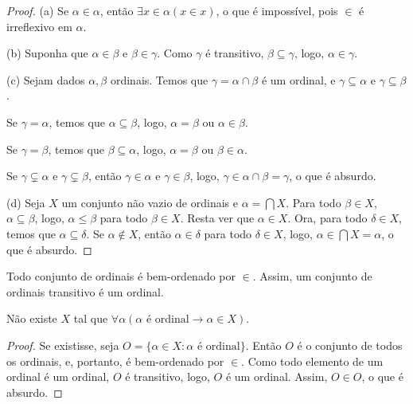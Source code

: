 \begin{proof}
    (a) Se $\alpha\in \alpha$, então $\exists x \in \alpha(x \in x)$, o que é impossível, pois $\in$ é irreflexivo em $\alpha$.

    (b) Suponha que $\alpha\in \beta$ e $\beta\in \gamma$.
    Como $\gamma$ é transitivo, $\beta\subseteq \gamma$, logo, $\alpha\in \gamma$.

    (c) Sejam dados $\alpha, \beta$ ordinais.
    Temos que $\gamma=\alpha\cap \beta$ é um ordinal, e $\gamma\subseteq \alpha$ e $\gamma\subseteq \beta$.

    Se $\gamma=\alpha$, temos que $\alpha\subseteq \beta$, logo, $\alpha=\beta$ ou $\alpha\in \beta$.

    Se $\gamma=\beta$, temos que $\beta\subseteq \alpha$, logo, $\alpha=\beta$ ou $\beta\in \alpha$.

    Se $\gamma\subsetneq \alpha$ e $\gamma\subsetneq \beta$, então $\gamma\in \alpha$ e $\gamma\in \beta$, logo, $\gamma\in \alpha\cap \beta=\gamma$, o que é absurdo.

    (d) Seja $X$ um conjunto não vazio de ordinais e $\alpha=\bigcap X$.
    Para todo $\beta\in X$, $\alpha\subseteq \beta$, logo, $\alpha\leq \beta$ para todo $\beta\in X$.
    Resta ver que $\alpha \in X$.
    Ora, para todo $\delta \in X$, temos que $\alpha\subseteq \delta$.
    Se $\alpha\notin X$, então $\alpha\in \delta$ para todo $\delta \in X$, logo, $\alpha\in \bigcap X=\alpha$, o que é absurdo.
\end{proof}

\begin{corollary}[$\BST$]\label{cor:conjuntoTransitivoDeOrdinaisEhOrdinal}
Todo conjunto de ordinais é bem-ordenado por $\in$.
Assim, um conjunto de ordinais transitivo é um ordinal.
\end{corollary}
\begin{corollary}[$\BST$]\label{cor:naoExisteConjuntoDeTodosOrdinais}
Não existe $X$ tal que $\forall \alpha(\alpha \text{ é ordinal} \rightarrow \alpha\in X)$.
\end{corollary}
\begin{proof}
    Se existisse, seja $O=\{\alpha \in X: \alpha \text{ é ordinal}\}$.
    Então $O$ é o conjunto de todos os ordinais, e, portanto, é bem-ordenado por $\in$.
    Como todo elemento de um ordinal é um ordinal, $O$ é transitivo, logo, $O$ é um ordinal.
    Assim, $O\in O$, o que é absurdo.
\end{proof}

